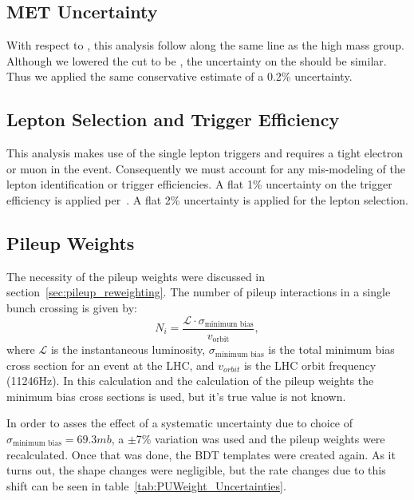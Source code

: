 \subsection{MET Uncertainty}

With respect to \ETslash, this analysis follow along the same line as the high mass \lvjj group.
Although we lowered the cut to be \joinsym{\ETslash}{\geqslant}{25\gev}, the uncertainty on the \ETslash should be similar.
Thus we applied the same conservative estimate of a 0.2\% uncertainty.

\subsection{Lepton Selection and Trigger Efficiency}

This analysis makes use of the single lepton triggers and requires a tight electron or muon in the event.
Consequently we must account for any mis-modeling of the lepton identification or trigger efficiencies.
A flat 1\% uncertainty on the trigger efficiency is applied per~\cite{CMS-PAS-HIG-13-027}.
A flat 2\% uncertainty is applied for the lepton selection.

\subsection{Pileup Weights}
The necessity of the pileup weights were discussed in section~\ref{sec:pileup_reweighting}.
The number of pileup interactions in a single bunch crossing is given by:
\begin{equation}
  N_{i}=\frac{\mathcal{L}\cdot\sigma_{\text{minimum bias}}}{v_{\text{orbit}}},
\end{equation}
where $\mathcal{L}$ is the instantaneous luminosity, $\sigma_{\text{minimum bias}}$ is the total minimum bias cross section for an event at the LHC, and $v_{orbit}$ is the LHC orbit frequency (11246\unit{Hz}).
In this calculation and the calculation of the pileup weights the minimum bias cross sections is used, but it's true value is not known.

In order to asses the effect of a systematic uncertainty due to choice of $\sigma_{\text{minimum bias}}=69.3\unit{mb}$, a $\pm$7\% variation was used and the pileup weights were recalculated.
Once that was done, the BDT templates were created again.
As it turns out, the shape changes were negligible, but the rate changes due to this shift can be seen in table~\ref{tab:PUWeight_Uncertainties}.

